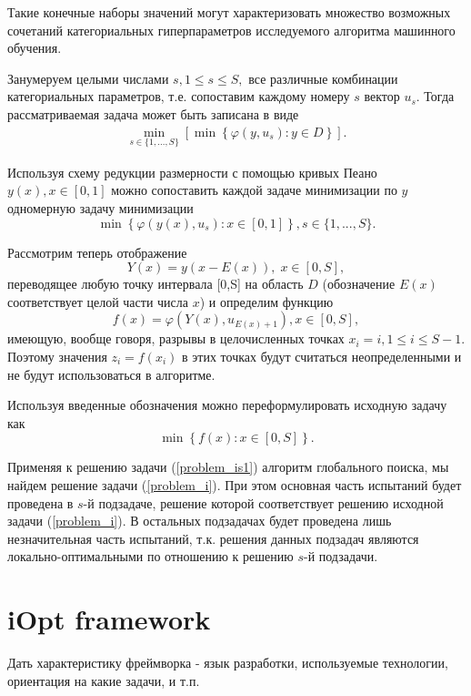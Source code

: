 \documentclass[preprint,12pt]{elsarticle}
\begin{document}
Такие конечные наборы значений могут характеризовать множество возможных сочетаний категориальных гиперпараметров исследуемого алгоритма машинного обучения. 

Занумеруем целыми числами $s, 1\leq s \leq S,$ все различные комбинации категориальных параметров, т.е. сопоставим каждому номеру $s$ вектор $u_s$. 
Тогда рассматриваемая задача может быть записана в виде 
\begin{gather}\label{problem_is}
 \min_{s\in\{1,...,S\}}\left[\min{\left\{ \varphi(y,u_s) : y\in D \right\}}\right].
\end{gather}

Используя схему редукции размерности с помощью кривых Пеано $y(x), x\in [0,1]$ можно сопоставить каждой задаче минимизации по $y$ одномерную задачу минимизации
\[
 \min{\left\{ \varphi(y(x),u_s): x \in [0,1] \right\}}, s \in \{1,...,S\}.
\]

Рассмотрим теперь отображение 
\[
Y(x)=y(x-E(x)), \; x\in[0,S],
\]
переводящее любую точку интервала [0,S] на область $D$ (обозначение $E(x)$ соответствует целой части числа $x$) и определим функцию 
\[
f(x) = \varphi(Y(x),u_{E(x)+1}), x\in[0,S],
\]
имеющую, вообще говоря, разрывы в целочисленных точках $x_i = i, 1\leq i \leq S-1$.
Поэтому значения  $z_i = f(x_i)$ в этих точках будут считаться неопределенными и не будут использоваться в алгоритме.

Используя введенные обозначения можно переформулировать исходную задачу как
\begin{equation}\label{problem_is1}
\min \left\{f(x): x \in [0,S] \right\}.
\end{equation}

Применяя к решению задачи (\ref{problem_is1}) алгоритм глобального поиска, мы найдем решение задачи (\ref{problem_i}). При этом основная часть испытаний будет проведена в $s$-й подзадаче, решение которой соответствует решению исходной задачи (\ref{problem_i}). В остальных подзадачах будет проведена лишь незначительная часть испытаний, т.к. решения данных подзадач являются локально-оптимальными по отношению к решению $s$-й подзадачи.

\section{iOpt framework} 
\label{sec_iOpt}

Дать характеристику фреймворка - язык разработки, используемые технологии, ориентация на какие задачи, и т.п. 
\end{document}
